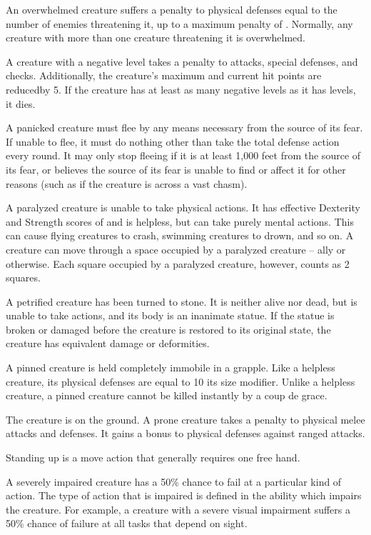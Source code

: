  An overwhelmed creature suffers a penalty to physical defenses equal to the number of enemies threatening it, up to a maximum penalty of . Normally, any creature with more than one creature threatening it is overwhelmed.

 A creature with a negative level takes a  penalty to attacks, special defenses, and checks. Additionally, the creature's maximum and current hit points are reducedby 5. If the creature has at least as many negative levels as it has levels, it dies.

 A panicked creature must flee by any means necessary from the source of its fear. If unable to flee, it must do nothing other than take the total defense action every round. It may only stop fleeing if it is at least 1,000 feet from the source of its fear, or believes the source of its fear is unable to find or affect it for other reasons (such as if the creature is across a vast chasm).

 A paralyzed creature is unable to take physical actions. It has effective Dexterity and Strength scores of  and is helpless, but can take purely mental actions. This can cause flying creatures to crash, swimming creatures to drown, and so on. A creature can move through a space occupied by a paralyzed creature -- ally or otherwise. Each square occupied by a paralyzed creature, however, counts as 2 squares.

 A petrified creature has been turned to stone. It is neither alive nor dead, but is unable to take actions, and its body is an inanimate statue. If the statue is broken or damaged before the creature is restored to its original state, the creature has equivalent damage or deformities.

 A pinned creature is held completely immobile in a grapple. Like a helpless creature, its physical defenses are equal to 10 \add its size modifier. Unlike a helpless creature, a pinned creature cannot be killed instantly by a coup de grace.

 The creature is on the ground. A prone creature takes a  penalty to physical melee attacks and defenses. It gains a  bonus to physical defenses against ranged attacks.

Standing up is a move action that generally requires one free hand.

 A severely impaired creature has a 50\% chance to fail at a particular kind of action. The type of action that is impaired is defined in the ability which impairs the creature. For example, a creature with a severe visual impairment suffers a 50\% chance of failure at all tasks that depend on sight.

